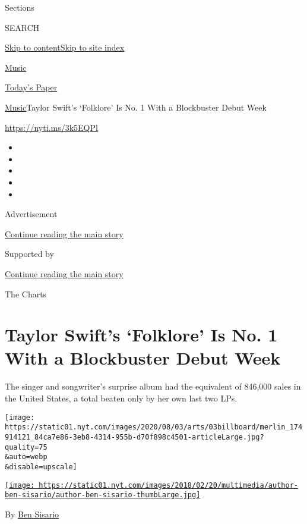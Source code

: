 Sections

SEARCH

\protect\hyperlink{site-content}{Skip to
content}\protect\hyperlink{site-index}{Skip to site index}

\href{https://www.nytimes.com/section/arts/music}{Music}

\href{https://myaccount.nytimes.com/auth/login?response_type=cookie\&client_id=vi}{}

\href{https://www.nytimes.com/section/todayspaper}{Today's Paper}

\href{/section/arts/music}{Music}\textbar{}Taylor Swift's `Folklore' Is
No. 1 With a Blockbuster Debut Week

\url{https://nyti.ms/3k5EQPl}

\begin{itemize}
\item
\item
\item
\item
\item
\end{itemize}

Advertisement

\protect\hyperlink{after-top}{Continue reading the main story}

Supported by

\protect\hyperlink{after-sponsor}{Continue reading the main story}

The Charts

\hypertarget{taylor-swifts-folklore-is-no-1-with-a-blockbuster-debut-week}{%
\section{Taylor Swift's `Folklore' Is No. 1 With a Blockbuster Debut
Week}\label{taylor-swifts-folklore-is-no-1-with-a-blockbuster-debut-week}}

The singer and songwriter's surprise album had the equivalent of 846,000
sales in the United States, a total beaten only by her own last two LPs.

\texttt{[image: https://static01.nyt.com/images/2020/08/03/arts/03billboard/merlin\_174914121\_84ca7e86-3eb8-4314-955b-d70f898c4501-articleLarge.jpg?quality=75\\\&auto=webp\\\&disable=upscale]}

\href{https://www.nytimes.com/by/ben-sisario}{\texttt{[image: https://static01.nyt.com/images/2018/02/20/multimedia/author-ben-sisario/author-ben-sisario-thumbLarge.jpg]}}

By \href{https://www.nytimes.com/by/ben-sisario}{Ben Sisario}

